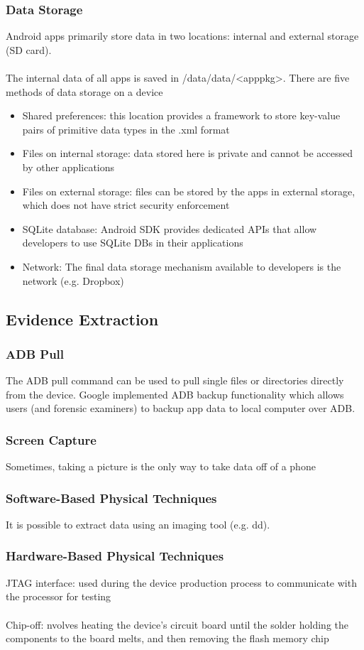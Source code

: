 \documentclass[10pt,a4paper]{report}
\begin{document}
\subsubsection{Data Storage}
Android apps primarily store data in two locations: internal and external storage (SD card).\\
\\
The internal data of all apps is saved in /data/data/<apppkg>. There are five methods of data storage on a device
\begin{itemize}
\item Shared preferences: this location provides a framework to store key-value pairs of primitive data types in the .xml format
\item Files on internal storage: data stored here is private and cannot be accessed by other applications
\item Files on external storage: files can be stored by the apps in external storage, which does not have strict security enforcement
\item SQLite database: Android SDK provides dedicated APIs that allow developers to use SQLite DBs in their applications
\item Network: The final data storage mechanism available to developers is the network (e.g. Dropbox)
\end{itemize}
\subsection{Evidence Extraction}
\subsubsection{ADB Pull}
The ADB pull command can be used  to pull single files or directories directly from the device. Google implemented ADB backup functionality which allows users (and forensic examiners) to backup app data to local computer over ADB.
\subsubsection{Screen Capture}
Sometimes, taking a picture is the only way to take data off of a phone
\subsubsection{Software-Based Physical Techniques}
It is possible to extract data using an imaging tool (e.g. dd).
\subsubsection{Hardware-Based Physical Techniques}
JTAG interface: used during the device production process to communicate with the processor for testing\\
\\
Chip-off: nvolves heating the device's circuit board until the solder holding the components to the board melts, and then removing the flash memory chip
\end{document}
